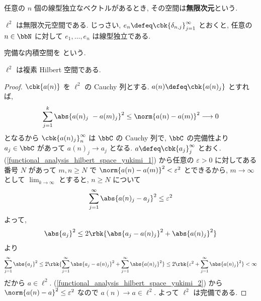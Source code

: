 \documentclass[openany, a4paper, oneside]{jsbook}
\begin{document}
\begin{defn}
任意の $n$ 個の線型独立なベクトルがあるとき, その空間は\textbf{無限次元}という.
\end{defn}
\begin{ex}
 $\ell^2$ は無限次元空間である.
 じっさい, $ e_{n} \defeq \cbk{\delta_{n,j}}_{j=1}^\infty$ とおくと,
 任意の $n \in \bbN$ に対して $e_{1}, \dots, e_{n}$ は線型独立である.
\end{ex}

\begin{defn}
 完備な内積空間を という.
\end{defn}
\begin{thm}
 $\ell^2$ は複素 Hilbert 空間である.
\end{thm}
\begin{proof}
$\cbk{a (n)}$ を $\ell^2$ の Cauchy 列とする.
$a(n) \defeq \cbk{a (n)_{j}}$ とすれば,
\begin{equation}
 \sum_{j=1}^k \abs{a (n)_{j}\ - a (m)_{j}}^2
 \leq
 \norm{a (n) - a (m)}^2
 \longrightarrow 0 \label{functional_analysis_hilbert_space_yukimi_1}
\end{equation}
となるから $\cbk{a (n)_{j}}_{n}^\infty$ は $\bbC$ の Cauchy 列で,
$\bbC$ の完備性より $a_{j} \in \bbC$ があって $a (n)_{j} \longrightarrow a_{j}$ となる.
$a \defeq \cbk{a_{j}}_{j}^\infty$ とおく.
(\ref{functional_analysis_hilbert_space_yukimi_1}) から任意の $\varepsilon > 0$ に対してある番号 $N$ があって
$m, n \geq N$ で $\norm{a (n) - a (m)}^2 < \varepsilon^2$ とできるから,
$m \longrightarrow \infty$ として $\lim_{k \to \infty}$ とすると, $n \geq N$ について
\begin{equation}
 \sum_{j=1}^\infty \abs{a (n)_{j} - a_{j}}^2
 \leq
 \varepsilon^2 \label{functional_analysis_hilbert_space_yukimi_2}
\end{equation}
よって,
\begin{align}
 \abs{a_{j}}^2
 \leq
 2 \rbk{\abs{a_j - a(n)_j}^2 + \abs{a(n)_{j}}^2}
\end{align}
より
\begin{align}
 \sum_{j=1}^\infty \abs{a_{j}}^2
 \leq
 2 \rbk{\sum_{j=1}^\infty \abs{a_{j} -a (n)_{j}}^2 + \sum_{j=1}^\infty \abs{a (n)_{j}}^2}
 \leq
 2 \rbk{\varepsilon^2 + \sum_{j=1}^\infty \abs{a (n)_{j}}^2}
 <
 \infty
\end{align}
だから $a \in \ell^2$.
(\ref{functional_analysis_hilbert_space_yukimi_2}) から
$\norm{a(n) - a}^2 \leq \varepsilon^2$
なので $a(n) \longrightarrow a \in \ell^2$.
よって $\ell^2$ は完備である.
\end{proof}
\end{document}
